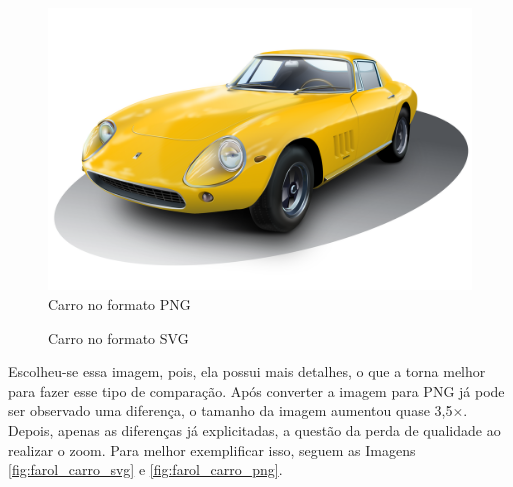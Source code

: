 \begin{figure}[h!]
    \centering
    \caption{Carro no formato PNG}
    \label{fig:carro_png}
    
    \includegraphics[scale=0.1]{Documeto/1-ElementosTextuais/1-Desenvolvimento/imagens-atividade1/car.png}

    
\end{figure}

\begin{figure}[h!]
    \centering
    \caption{Carro no formato SVG}
    \label{fig:carro_SVG}
    
    

    
\end{figure}

\hspace{1.5 cm} Escolheu-se essa imagem, pois, ela possui mais detalhes, o que a torna melhor para fazer esse tipo de comparação. Após converter a imagem para PNG já pode ser observado uma diferença, o tamanho da imagem aumentou quase 3,5$\times$. Depois, apenas as diferenças já explicitadas, a questão da perda de qualidade ao realizar o zoom. Para melhor exemplificar isso, seguem as Imagens \ref{fig:farol_carro_svg} e \ref{fig:farol_carro_png}.

